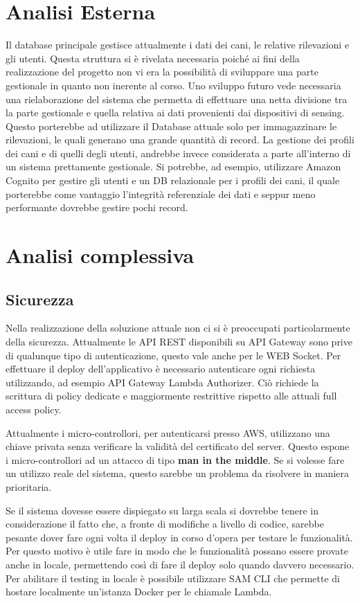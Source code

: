 \section{Analisi Esterna}
Il database principale gestisce attualmente i dati dei cani, le relative rilevazioni e gli utenti. Questa struttura si è rivelata necessaria poiché ai fini della realizzazione del progetto non vi era la possibilità di sviluppare una parte gestionale in quanto non inerente al corso. Uno sviluppo futuro vede necessaria una rielaborazione del sistema che permetta di effettuare una netta divisione tra la parte gestionale e quella relativa ai dati provenienti dai dispositivi di sensing. Questo porterebbe ad utilizzare il Database attuale solo per immagazzinare le rilevazioni, le quali generano una grande quantità di record. La gestione dei profili dei cani e di quelli degli utenti, andrebbe invece considerata a parte all'interno di un sistema prettamente gestionale. Si potrebbe, ad esempio, utilizzare Amazon Cognito per gestire gli utenti e un DB relazionale per i profili dei cani, il quale porterebbe come vantaggio l'integrità referenziale dei dati e seppur meno performante dovrebbe gestire pochi record.  
    
\section{Analisi complessiva}
    \subsection{Sicurezza}
Nella realizzazione della soluzione attuale non ci si è preoccupati particolarmente della sicurezza. Attualmente le API REST disponibili su API Gateway sono prive di qualunque tipo di autenticazione, questo vale anche per le WEB Socket. Per effettuare il deploy dell'applicativo è necessario autenticare ogni richiesta utilizzando, ad esempio API Gateway Lambda Authorizer. Ciò richiede la scrittura di policy dedicate e maggiormente restrittive rispetto alle attuali full access policy. 

Attualmente i micro-controllori, per autenticarsi presso AWS, utilizzano una chiave privata senza verificare la validità del certificato del server. Questo espone i micro-controllori ad un attacco di tipo \textbf{man in the middle}. Se si volesse fare un utilizzo reale del sistema, questo sarebbe un problema da risolvere in maniera prioritaria.




Se il sistema dovesse essere dispiegato su larga scala si dovrebbe tenere in considerazione il fatto che, a fronte di modifiche a livello di codice, sarebbe pesante dover fare ogni volta il deploy in corso d'opera per testare le funzionalità. Per questo motivo è utile fare in modo che le funzionalità possano essere provate anche in locale, permettendo così di fare il deploy solo quando davvero necessario.
Per abilitare il testing in locale è possibile utilizzare SAM CLI che permette di hostare localmente un'istanza Docker per le chiamale Lambda. 
